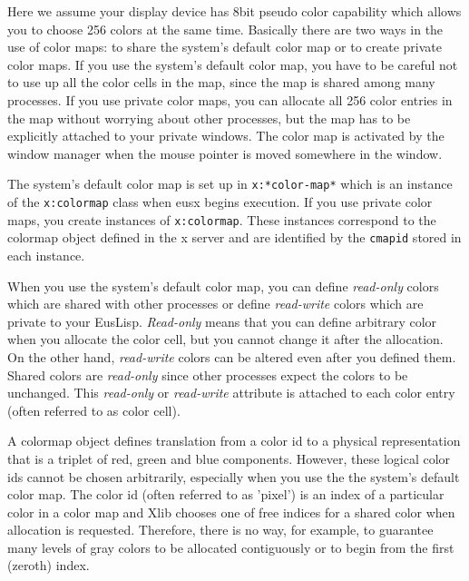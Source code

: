 \begin{refdesc}

\end{refdesc}

Here we assume your display device has 8bit pseudo color capability
which allows you to choose 256 colors at the same time.
Basically there are two ways in the use of color maps:
to share the system's default color map or to create private color maps.
If you use the system's default color map, you have to
be careful not to use up all the color cells in the map,
since the map is shared among many processes.
If you use private color maps, you can allocate all 256 color entries
in the map without worrying about other processes,
but  the map has to be explicitly attached to your private windows.
The color map is activated by the window manager
when the mouse pointer is moved somewhere in the window.

The system's default color map is set up in {\tt x:*color-map*}
which is an instance of the {\tt x:colormap} class
when eusx begins execution.
If you use private color maps, you create instances of {\tt x:colormap}.
These instances 
correspond to the colormap object defined in the x server and are identified by
the {\tt cmapid}  stored in each instance.

When you use the system's default color map, you can define {\em read-only}
colors which are shared with other processes or define {\em read-write}
colors which are private to your EusLisp.
{\em Read-only} means that you can define arbitrary
color when you allocate the color cell,
but you cannot change it after the allocation.
On the other hand,
{\em read-write} colors can be altered even after you defined them. 
Shared colors are {\em read-only} since other processes expect the colors to be
unchanged.
This {\em read-only} or {\em read-write} attribute is attached to each
color entry (often referred to as color cell).

A colormap object defines translation from a color id to a physical
representation that is a triplet of red, green and blue components.
However, these logical color ids cannot be chosen arbitrarily, especially when
you use the the system's default color map. The color id (often referred
to as 'pixel') is an index of a particular color in a color map and Xlib
chooses one of free indices for a shared color when allocation is requested.
Therefore, there is no way, for example, to  guarantee  many levels of
gray colors to be allocated contiguously or to begin from the first (zeroth)
index.  


